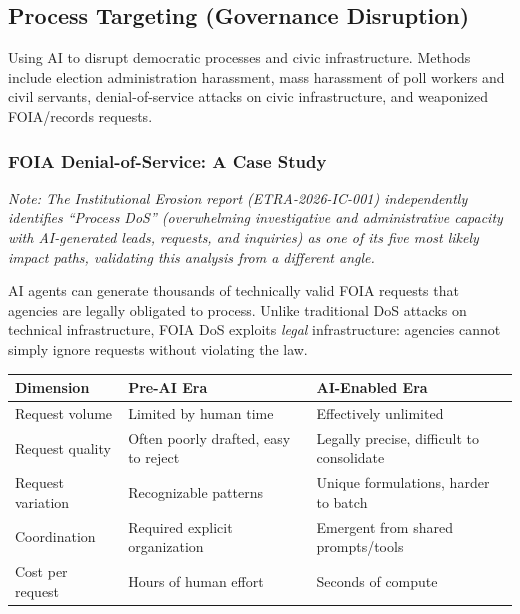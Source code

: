 \documentclass[11pt,letterpaper]{article}
\begin{document}
\subsection{Process Targeting (Governance Disruption)}

Using AI to disrupt democratic processes and civic infrastructure. Methods include election administration harassment, mass harassment of poll workers and civil servants, denial-of-service attacks on civic infrastructure, and weaponized FOIA/records requests.

\subsubsection{FOIA Denial-of-Service: A Case Study}

\textit{Note: The Institutional Erosion report (ETRA-2026-IC-001) independently identifies ``Process DoS'' (overwhelming investigative and administrative capacity with AI-generated leads, requests, and inquiries) as one of its five most likely impact paths, validating this analysis from a different angle.}

AI agents can generate thousands of technically valid FOIA requests that agencies are legally obligated to process. Unlike traditional DoS attacks on technical infrastructure, FOIA DoS exploits \textit{legal} infrastructure: agencies cannot simply ignore requests without violating the law.

\begin{center}
\small
\begin{tabular}{L{3.5cm}L{4.5cm}L{4.5cm}}
\toprule
\textbf{Dimension} & \textbf{Pre-AI Era} & \textbf{AI-Enabled Era} \\
\midrule
Request volume & Limited by human time & Effectively unlimited \\
Request quality & Often poorly drafted, easy to reject & Legally precise, difficult to consolidate \\
Request variation & Recognizable patterns & Unique formulations, harder to batch \\
Coordination & Required explicit organization & Emergent from shared prompts/tools \\
Cost per request & Hours of human effort & Seconds of compute \\
\bottomrule
\end{tabular}
\end{center}
\end{document}
